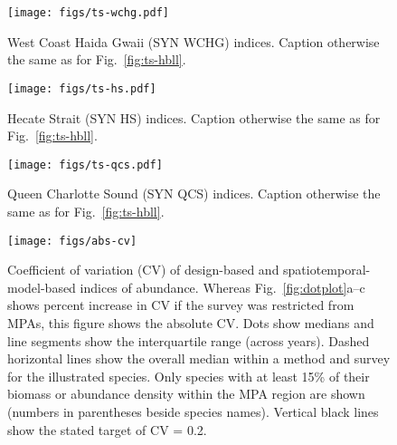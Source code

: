 \documentclass[12pt]{article}
\begin{document}
\clearpage

\begin{figure}[htb]
    \centering
    \texttt{[image: figs/ts-wchg.pdf]}
    \caption{West Coast Haida Gwaii (SYN WCHG) indices. Caption otherwise the same as for
    Fig.~\ref{fig:ts-hbll}.}
    \label{fig:ts-wchg}
\end{figure}

\clearpage

\begin{figure}[htb]
    \centering
    \texttt{[image: figs/ts-hs.pdf]}
    \caption{Hecate
      Strait (SYN HS) indices. Caption otherwise the same as for Fig.~\ref{fig:ts-hbll}.}
    \label{fig:ts-hs}
\end{figure}

\clearpage

\begin{figure}[htb]
    \centering
    \texttt{[image: figs/ts-qcs.pdf]}
    \caption{Queen Charlotte Sound (SYN QCS) indices. Caption otherwise the same as for Fig.~\ref{fig:ts-hbll}.}
    \label{fig:ts-qcs}
\end{figure}

\clearpage



\begin{figure}[htb]
    \centering
    \texttt{[image: figs/abs-cv]}
    \caption{Coefficient of variation (CV) of design-based and spatiotemporal-model-based indices of abundance. Whereas Fig.~\ref{fig:dotplot}a--c shows percent increase in CV if the survey was restricted from MPAs, this figure shows the absolute CV. Dots show medians and line segments show the interquartile range (across years). Dashed horizontal lines show the overall median within a method and survey for the illustrated species. Only species with at least 15\% of their biomass or abundance density within the MPA region are shown (numbers in parentheses beside species names). Vertical black lines show the stated target of CV = 0.2.}
    \label{fig:cv-abs}
\end{figure}
\end{document}

